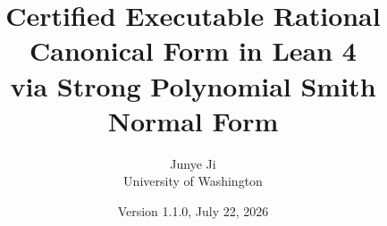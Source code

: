 \documentclass[11pt]{article}
\title{Certified Executable Rational Canonical Form in Lean 4\\
via Strong Polynomial Smith Normal Form}
\author{Junye Ji\\University of Washington}
\date{Version 1.1.0, July 22, 2026}
\begin{document}
\maketitle

\begin{abstract}

\end{abstract}










\end{document}
